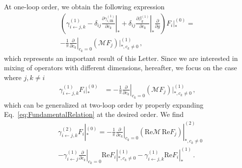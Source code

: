 \documentclass[prl,twocolumn,twoside,preprintnumbers,superscriptaddress, nofootinbib]{revtex4-2}
\begin{document}
At one-loop order, we obtain the following expression 
%
\begin{multline}
\label{eq:mastergammageneral}
    \left( \gamma_{i\leftarrow j,k}^{(1)} - \delta_{ij}\left.\frac{\partial \gamma^{(1)}_{i,\text{IR}}}{\partial c_k} \right|_{*}+\delta_{ij}\left.\frac{\partial \beta_g^{(1)}}{\partial c_k} \right|_{*}\frac{\partial}{\partial g} \right) F_i|_{*}^{(0)} = \\ -\frac{1}{\pi}\left.\frac{\partial}{\partial c_k}\right|_{c_k=0}(\mathcal M F_j)|_{*,c_k\neq 0}^{(1)} \,,
\end{multline}
%
which represents an important result of this Letter.
Since we are interested in mixing of operators with different dimensions, hereafter, we focus on the case where $j,k\neq i$ %
%
\begin{align}
\label{eq:mastergammaijk}
\gamma_{i\leftarrow j,k}^{(1)}F_i|_{*}^{(0)} &= -\frac{1}{\pi}\left.\frac{\partial}{\partial c_k}\right|_{c_k=0}(\mathcal M F_j)|_{*,c_k\neq 0}^{(1)} \,,
\end{align}
%
which can be generalized at two-loop order by properly expanding Eq.~\eqref{eq:FundamentalRelation} at the desired order. We find
%
%
%
\begin{align}
\label{eq:mastergammaijk_2loop}
&\gamma_{i\leftarrow j,k}^{(2)} F_i|_{*}^{(0)} = -\frac{1}{\pi}\left.\frac{\partial}{\partial c_k}\right|_{c_k=0}%
(\text{Re}\mathcal M \, \text{Re} F_j)|_{*,c_k\neq 0}^{(2)} \nonumber \\
& - \gamma_{i\leftarrow j}^{(1)}\left.\frac{\partial}{\partial c_k}\right|_{c_k=0} \text{Re}F_i|_{*,c_k\neq 0}^{(1)} 
- \gamma_{i\leftarrow j,k}^{(1)} \text{Re}F_i|_{*}^{(1)}\,.
\end{align}
\end{document}

